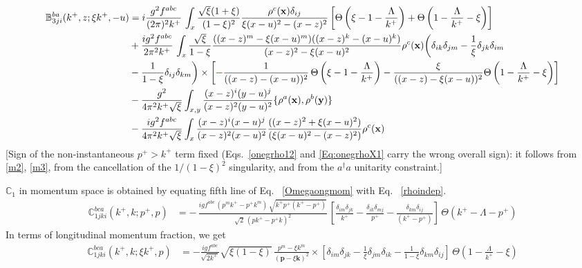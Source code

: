 \documentclass[aps,prd,amsmath,amssymb,nofootinbib]{revtex4-2}
\def\mf#1{\mathbb{#1}}
\def\v#1{\mathbf{#1}}
\numberwithin{equation}{section}
\begin{document}
\begin{align}
   \mf{B}^{ba}_{3ji}(k^+, z;\xi k^+, -u) & = i \frac{g^2 f^{abc}}{(2\pi)^{2} k^{+}}\,\int_{x}
   \frac{\sqrt{\xi} (1+\xi) } {(1-\xi)^2} \frac{\rho^c(\v{x}) \delta_{ij}}{\xi (x-u)^{2} - (x-z)^{2} }\left[\Theta\left(\xi - 1 - \frac{\Lambda}{k^{+}}\right)+\Theta\left(1-\frac{\Lambda}{k^{+}}-\xi\right)\right]  \notag \\ & + \frac{ig^2 f^{abc}} {2\pi^{2} k^{+}}\,  
   \int_{x}  
   \frac{\sqrt{\xi}}{1-\xi} 
   \frac{((x-z)^{m} - \xi (x-u)^m)((x-z)^{k} -  (x-u)^{k})} {(x-z)^{2} - \xi (x-u)^2}
   \rho^c(\v{x}) \bigg( 
  \delta_{ik} \delta_{jm}
  - \frac{1}{\xi}\delta_{jk} \delta_{im}
 \notag \\ &  - \frac{1}{1-\xi}\delta_{ij} \delta_{km}
   \bigg)\times  \left[{\color{red}-}\frac{1}{((x-z) -  (x-u))^2}\,\Theta\left(\xi - 1 - \frac{\Lambda}{k^{+}}\right)-\frac{\xi}{((x-z) -  \xi (x-u))^2} \Theta\left(1-\frac{\Lambda}{k^{+}}-\xi\right)\right]\notag \\ & -\frac{g^{2}}{4\pi^{2} k^{+}\sqrt{\xi}}\int_{x,y}\frac{(x-z)^{i} (y-u)^{j}}{(x-z)^{ 2}(y-u)^{2}}\{\rho^{a}(\v{x}),\rho^{b}(\v{y})\} \notag \\ &  -\frac{ig^{2}f^{abc}}{4\pi^{2} k^{+}\sqrt{\xi}} \int_{x}\frac{(x-z)^{i}(x-u)^{j}}{(x-z)^{2}(x-u)^{2}}\frac{((x-z)^{2} +\xi (x-u)^{2})}{(\xi (x-u)^{2}-(x-z)^{2})}\rho^{c}(\v{x})
\end{align} {\color{red}[Sign of the non-instantaneous $p^+>k^+$ term fixed (Eqs.~\eqref{onegrho12} and \eqref{Eq:onegrhoX1} carry the wrong overall sign): it follows from \eqref{m2}, \eqref{m3}, from the cancellation of the $1/(1-\xi)^2$ singularity, and from the $a^\dagger a$ unitarity constraint.]}\par\noindent 
$\mf{C}_{1}$ in momentum space is obtained by equating fifth line of Eq.~ \eqref{Omegaongmom} with Eq.~ \eqref{rhoindep}. 
\begin{align}
    \mf{C}^{bca}_{1jki}(k^{+},k; p^{+},p) & = -\,\frac{igf^{abc}\, \left(p^{m}k^{+}-p^{+}k^{m}\right)\,\sqrt{k^{+}p^{+}(k^{+}-p^{+})}}{\sqrt{2}\,\left(pk^{+}-p^{+}k\right)^{2}}\,\left[\frac{\delta_{im}\delta_{jk}}{k^{+}}-\frac{\delta_{ik}\delta_{mj}}{p^{+}}-\frac{\delta_{km}\delta_{ij}}{(k^{+}-p^{+})}\right]\,\Theta\left(k^{+}-\Lambda-p^{+}\right) 
\end{align}
In terms of longitudinal momentum fraction, we get
\begin{align}
  \mf{C}^{bca}_{1jki}(k^{+}, k; \xi k^{+}, p) & = -\frac{ i g f^{abc}} {\sqrt{2 k^+}} 
    \sqrt{\xi (1-\xi)}\,  
   \frac{p^m - \xi k^m  }{( \v{p}- \xi \v{k} )^2 } \times
   \left[ \delta_{im} \delta_{jk}
     - \frac{1}{\xi}\delta_{jm} \delta_{ik}
   - \frac{1}{1-\xi} \delta_{km}\delta_{ij}
 \right]\, \Theta\left(1-\frac{\Lambda}{k^{+}}-\xi\right)
\end{align}
\end{document}
